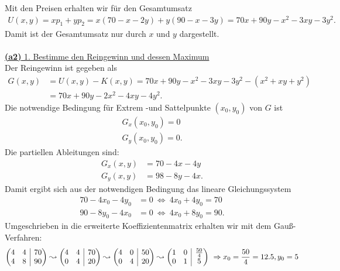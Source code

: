 Mit den Preisen erhalten wir für den Gesamtumsatz
\begin{align*}
	U(x,y) = 
	x p_1 + y p_2 = 
	x (70 - x - 2y) + y (90 -x - 3y)
	=
	70x + 90 y- x^2 - 3 xy - 3 y^2.
\end{align*} 
Damit ist der Gesamtumsatz nur durch $ x $ und $ y $ dargestellt.\\
\\
\underline{\textbf{(a2)} 1. Bestimme den Reingewinn und dessen Maximum}\\
Der Reingewinn ist gegeben als 
\begin{align*}
	G(x,y) &= U(x,y) - K(x,y) = 70x + 90 y- x^2 - 3 xy - 3 y^2 - (x^2 + xy + y^2 )\\
	&=
	70x + 90 y- 2x^2 -4 xy- 4 y^2.
\end{align*}
Die notwendige Bedingung für Extrem -und Sattelpunkte $ (x_0,y_0) $ von $ G $ ist
\begin{align*}
	G_x(x_0,y_0) =0 \\
	G_y(x_0,y_0) =0.
\end{align*}
Die partiellen Ableitungen sind:
\begin{align*}
	G_x(x,y) &= 70 - 4x - 4 y\\
	G_y(x,y) &= 98 -8y -4 x.
\end{align*}
Damit ergibt sich aus der notwendigen Bedingung das lineare Gleichungssystem
\begin{align*}
	70 - 4 x_0 - 4y_0 &= 0 \ \Leftrightarrow \ 4 x_0 + 4 y_0 = 70\\
	90 - 8 y_0 - 4 x_0 &= 0 \ \Leftrightarrow \ 4x_0 + 8y_0 = 90.
\end{align*}
Umgeschrieben in die erweiterte Koeffizientenmatrix erhalten wir mit dem Gauß-Verfahren:
\begin{align*}
	\begin{pmatrix}
		4 & 4 & \BAR &  70\\
		4 & 8 & \BAR & 90
	\end{pmatrix}
	\leadsto
	\begin{pmatrix}
		4 & 4 & \BAR &  70\\
		0 & 4 & \BAR & 20
	\end{pmatrix}
\leadsto
\begin{pmatrix}
	4 & 0 & \BAR &  50\\
	0 & 4 & \BAR & 20
\end{pmatrix}
\leadsto
\begin{pmatrix}
	1 & 0 & \BAR &  \frac{50}{4}\\
	0 & 1 & \BAR & 5
\end{pmatrix} \ \Rightarrow x_0 = \frac{50}{4}  =12.5, y_0 = 5
\end{align*}
